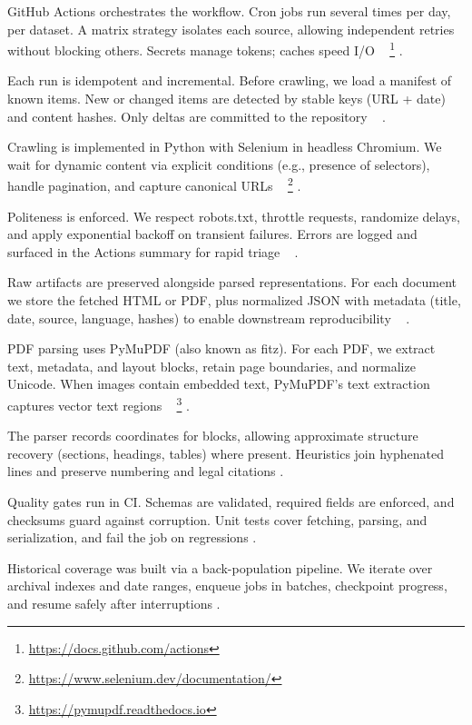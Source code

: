 \documentclass[10pt,a4paper]{article}%
\begin{document}
%
GitHub Actions orchestrates the workflow.
 Cron jobs run several times per day, per
 dataset. A matrix strategy isolates each source,
 allowing independent retries without blocking
 others. Secrets manage tokens; caches speed I/O%
~%
\footnote{\href{https://docs.github.com/actions}{https://docs.github.com/actions}}%
.%

%
Each run is idempotent and incremental.
 Before crawling, we load a manifest of known
 items. New or changed items are detected by
 stable keys (URL + date) and content hashes.
 Only deltas are committed to the repository%
~%
\citep{ReproducibleResearch2017}%
.%

%
Crawling is implemented in Python with
 Selenium in headless Chromium.
 We wait for dynamic content via explicit
 conditions (e.g., presence of selectors),
 handle pagination, and capture canonical URLs%
~%
\footnote{\href{https://www.selenium.dev/documentation/}{https://www.selenium.dev/documentation/}}%
.%

%
Politeness is enforced. We respect robots.txt,
 throttle requests, randomize delays, and apply
 exponential backoff on transient failures.
 Errors are logged and surfaced in the Actions
 summary for rapid triage%
~%
\citep{WebCrawlingBestPractices2021}%
.%

%
Raw artifacts are preserved alongside parsed
 representations. For each document we store
 the fetched HTML or PDF, plus normalized JSON
 with metadata (title, date, source, language,
 hashes) to enable downstream reproducibility%
~%
\citep{DataVersioning2020}%
.%

%
PDF parsing uses PyMuPDF (also known as fitz). For each PDF,
 we extract text, metadata, and layout blocks,
 retain page boundaries, and normalize Unicode.
 When images contain embedded text, PyMuPDF’s
 text extraction captures vector text regions%
~%
\footnote{\href{https://pymupdf.readthedocs.io}{https://pymupdf.readthedocs.io}}%
.%

%
The parser records coordinates for blocks, allowing approximate structure recovery (sections, headings, tables) where present. Heuristics join hyphenated lines and preserve numbering and legal citations .%

%
Quality gates run in CI. Schemas are validated, required fields are enforced, and checksums guard against corruption. Unit tests cover fetching, parsing, and serialization, and fail the job on regressions .%

%
Historical coverage was built via a back-population pipeline. We iterate over archival indexes and date ranges, enqueue jobs in batches, checkpoint progress, and resume safely after interruptions .%
\end{document}
